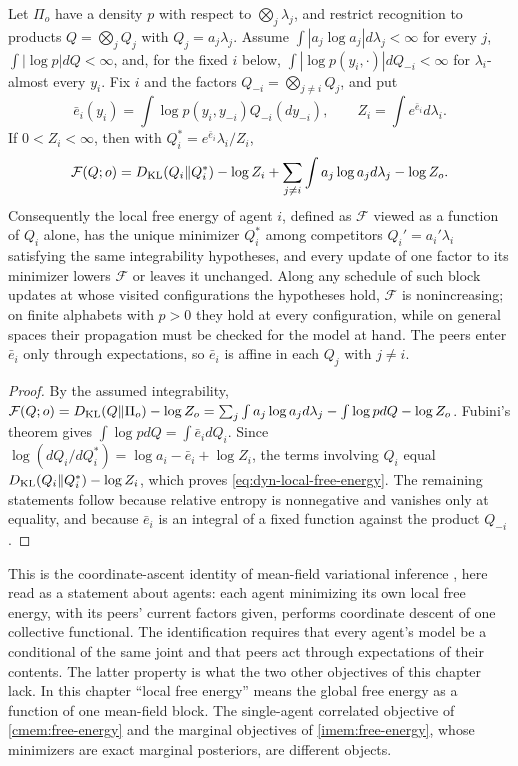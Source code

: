 Let $\Pi_o$ have a density $p$ with respect to $\bigotimes_j\lambda_j$, and restrict recognition to products $Q=\bigotimes_jQ_j$ with $Q_j=a_j\lambda_j$. Assume $\int|a_j\log a_j|d\lambda_j<\infty$ for every $j$, $\int|\log p|dQ<\infty$, and, for the fixed $i$ below, $\int|\log p(y_i,\cdot)|dQ_{-i}<\infty$ for $\lambda_i$-almost every $y_i$. Fix $i$ and the factors $Q_{-i}=\bigotimes_{j\neq i}Q_j$, and put
\begin{equation}
 \bar e_i(y_i)=\int\log p(y_i,y_{-i})Q_{-i}(dy_{-i}),
 \qquad
 Z_i=\int e^{\bar e_i}d\lambda_i.
 \label{eq:dyn-mean-field-field}
\end{equation}
If $0<Z_i<\infty$, then with $Q_i^*=e^{\bar e_i}\lambda_i/Z_i$,
\begin{equation}
 \mathcal F(Q;o)=D_{\mathrm{KL}}(Q_i\Vert Q_i^*)-\log Z_i
 +\sum_{j\neq i}\int a_j\log a_jd\lambda_j-\log Z_o.
 \label{eq:dyn-local-free-energy}
\end{equation}
Consequently the local free energy of agent $i$, defined as $\mathcal F$ viewed as a function of $Q_i$ alone, has the unique minimizer $Q_i^*$ among competitors $Q_i'=a_i'\lambda_i$ satisfying the same integrability hypotheses, and every update of one factor to its minimizer lowers $\mathcal F$ or leaves it unchanged. Along any schedule of such block updates at whose visited configurations the hypotheses hold, $\mathcal F$ is nonincreasing; on finite alphabets with $p>0$ they hold at every configuration, while on general spaces their propagation must be checked for the model at hand. The peers enter $\bar e_i$ only through expectations, so $\bar e_i$ is affine in each $Q_j$ with $j\neq i$.
\begin{proof}
By the assumed integrability, $\mathcal F(Q;o)=D_{\mathrm{KL}}(Q\Vert\Pi_o)-\log Z_o=\sum_j\int a_j\log a_jd\lambda_j-\int\log p dQ-\log Z_o$. Fubini's theorem gives $\int\log p dQ=\int\bar e_idQ_i$. Since $\log(dQ_i/dQ_i^*)=\log a_i-\bar e_i+\log Z_i$, the terms involving $Q_i$ equal $D_{\mathrm{KL}}(Q_i\Vert Q_i^*)-\log Z_i$, which proves \cref{eq:dyn-local-free-energy}. The remaining statements follow because relative entropy is nonnegative and vanishes only at equality, and because $\bar e_i$ is an integral of a fixed function against the product $Q_{-i}$.
\end{proof}

This is the coordinate-ascent identity of mean-field variational inference \citep{Bishop2006,BleiEtAl2017}, here read as a statement about agents: each agent minimizing its own local free energy, with its peers' current factors given, performs coordinate descent of one collective functional. The identification requires that every agent's model be a conditional of the same joint and that peers act through expectations of their contents. The latter property is what the two other objectives of this chapter lack. In this chapter ``local free energy'' means the global free energy as a function of one mean-field block. The single-agent correlated objective of \cref{cmem:free-energy} and the marginal objectives of \cref{imem:free-energy}, whose minimizers are exact marginal posteriors, are different objects.


